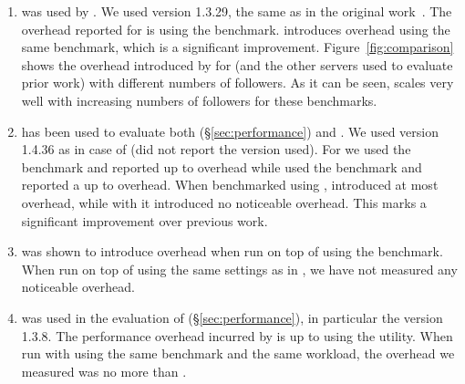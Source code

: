 \begin{enumerate}

\item[\httpd\footnote{\url{https://httpd.apache.org/}}]
was used by \orchestra.  We used version 1.3.29, the same as in the original
work~\cite{orchestra09}.  The overhead reported for \orchestra is
\orchestraHttpd using the \apachebench benchmark. \varan introduces
\httpdAbOneFollower overhead using the same benchmark, which is a significant
improvement.  Figure~\ref{fig:comparison} shows the overhead introduced by
\varan for \httpd (and the other servers used to evaluate prior work) with
different numbers of followers.  As it can be seen, \varan scales very well
with increasing numbers of followers for these benchmarks.


\item[\lighttpd\footnote{\url{http://www.lighttpd.net/}}]
has been used to evaluate both \mx (\S\ref{sec:performance}) and \tachyon.  We
used version 1.4.36 as in case of \mx (\tachyon did not report the version
used).  For \mx we used the \httpload benchmark and reported up to \mxLighttpd
overhead while \tachyon used the \apachebench benchmark and reported a up
to \tachyonLighttpd overhead.  When benchmarked using \httpload, \varan
introduced at most \lighttpdHttploadOneFollower overhead, while with
\apachebench it introduced no noticeable overhead.  This marks a
significant improvement over previous work.

\item[\thttpd\footnote{\url{http://www.acme.com/software/thttpd/}}]
was shown to introduce \tachyonThttpd overhead when run on top of
\tachyon using the \apachebench benchmark. When run on top of
\varan using the same settings as in \cite{tachyon12}, we have not
measured any noticeable overhead.

\item[\redis\footnote{\url{http://redis.io/}}]
was used in the evaluation of \mx (\S\ref{sec:performance}), in particular the
version 1.3.8. The performance overhead incurred by \mx is up to \mxRedis using
the \redisbenchmark utility. When run with \varan using the same benchmark and
the same workload, the overhead we measured was no more than \redisOneFollower.


\end{enumerate}
